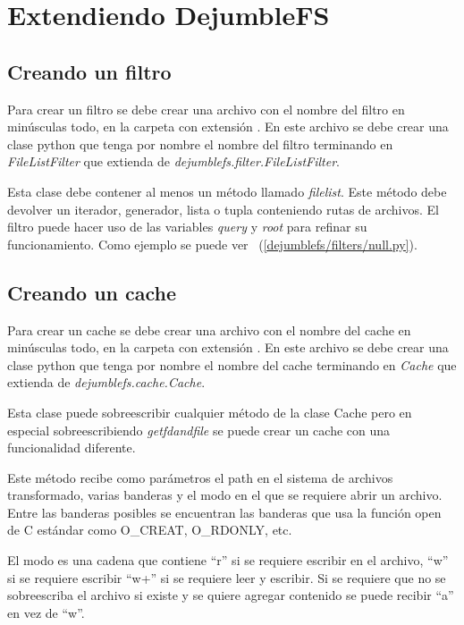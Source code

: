 \section{Extendiendo DejumbleFS}

\subsection{Creando un filtro}

Para crear un filtro se debe crear una archivo con el nombre del filtro en minúsculas todo, en la carpeta  con extensión . En este archivo se debe crear una clase python que tenga por nombre el nombre del filtro terminando en \textit{FileListFilter} que extienda de \textit{dejumblefs.filter.FileListFilter}.

Esta clase debe contener al menos un método llamado \textit{filelist}. Este método debe devolver un iterador, generador, lista o tupla conteniendo rutas de archivos. El filtro puede hacer uso de las variables \textit{query} y \textit{root} para refinar su funcionamiento. Como ejemplo se puede ver ~(\ref{dejumblefs/filters/null.py}).

\subsection{Creando un cache}

Para crear un cache se debe crear una archivo con el nombre del cache en minúsculas todo, en la carpeta  con extensión . En este archivo se debe crear una clase python que tenga por nombre el nombre del cache terminando en \textit{Cache} que extienda de \textit{dejumblefs.cache.Cache}.

Esta clase puede sobreescribir cualquier método de la clase Cache pero en especial sobreescribiendo \textit{getfdandfile} se puede crear un cache con una funcionalidad diferente.

Este método recibe como parámetros el path en el sistema de archivos transformado, varias banderas y el modo en el que se requiere abrir un archivo. Entre las banderas posibles se encuentran las banderas que usa la función open de C estándar como O\_CREAT, O\_RDONLY, etc.

El modo es una cadena que contiene ``r'' si se requiere escribir en el archivo, ``w'' si se requiere escribir ``w+'' si se requiere leer y escribir. Si se requiere que no se sobreescriba el archivo si existe y se quiere agregar contenido se puede recibir ``a'' en vez de ``w''.


